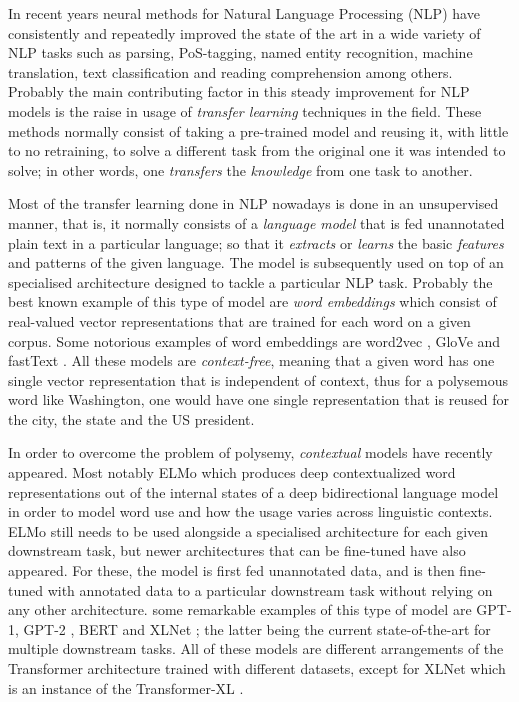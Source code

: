 In recent years neural methods for Natural Language Processing (NLP) have consistently and repeatedly improved the state of the art in a wide variety of NLP tasks such as parsing, PoS-tagging, named entity recognition, machine translation, text classification and reading comprehension among others. Probably the main contributing factor in this steady improvement for NLP models is the raise in usage of \emph{transfer learning} techniques in the field. These methods normally consist of taking a pre-trained model and reusing it, with little to no retraining, to solve a different task from the original one it was intended to solve; in other words, one \emph{transfers} the \emph{knowledge} from one task to another.

Most of the transfer learning done in NLP nowadays is done in an unsupervised manner, that is, it normally consists of a  \emph{language model} that is fed unannotated plain text in a particular language; so that it \emph{extracts} or \emph{learns} the basic \emph{features} and patterns of the given language. The model is subsequently used on top of an specialised architecture designed to tackle a particular NLP task. Probably the best known example of this type of model are \emph{word embeddings} which consist of real-valued vector representations that are trained for each word on a given corpus. Some notorious examples of word embeddings are word2vec \citep{mikolov-etal-2013-distributed}, GloVe \citep{pennington-etal-2014-glove} and \mbox{fastText} \citep{mikolov-etal-2018-advances}. All these models are \emph{context-free}, meaning that a given word has one single vector representation that is independent of context, thus for a polysemous word like Washington, one would have one single representation that is reused for the city, the state and the US president.

In order to overcome the problem of polysemy, \emph{contextual} models have recently appeared. Most notably ELMo \citep{peters-etal-2018-deep} which produces deep contextualized word representations out of the internal states of a deep bidirectional language model in order to model word use and how the usage varies across linguistic contexts. ELMo still needs to be used alongside a specialised architecture for each given downstream task, but newer architectures that can be fine-tuned have also appeared. For these, the model is first fed unannotated data, and is then fine-tuned with annotated data to a particular downstream task without relying on any other architecture. some remarkable examples of this type of model are GPT-1, GPT-2 \citep{radford-etal-2018-improving,radford-etal-2019-language}, BERT \citep{devlin-etal-2019-bert} and XLNet \citep{yang-etal-2019-xlnet}; the latter being the current state-of-the-art for multiple downstream tasks. All of these models are different arrangements of the Transformer architecture \citep{vaswani-etal-2017-attention} trained with different datasets, except for XLNet which is an instance of the Transformer-XL \citep{dai-etal-2019-transformer}.


